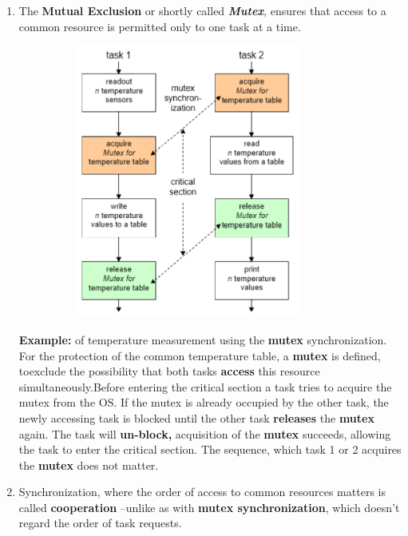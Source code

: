 \begin{enumerate}
\item The \textbf{Mutual Exclusion }or shortly called \textbf{\textit{Mutex}}, ensures that access to a common resource is permitted only to one task at a time. 

 	\begin{figure}[h]
    \centering
    \includegraphics[width=9cm, height=9cm]{Images/image103.png}
    \label{fig:Fig 49}
    \end{figure}
\os{\newpage}
\textbf{Example:} of temperature measurement using the \textbf{mutex} synchronization.\\

For the protection of the common temperature table, a \textbf{mutex} is defined, toexclude the possibility that both tasks \textbf{access} this resource simultaneously.Before entering the critical section a task tries to acquire the mutex from the OS. If the mutex is already occupied by the other task, the newly accessing task is blocked\textbf{\textit{ }}until the other task \textbf{releases} the \textbf{mutex} again. The task will \textbf{un-block,} acquisition of the \textbf{mutex} succeeds, allowing the task to enter the critical section. The sequence, which task 1 or 2 acquires the \textbf{mutex} does not matter.

\item Synchronization, where the order of access to common resources matters is called \textbf{cooperation} --unlike as with\textbf{ mutex synchronization}, which doesn't regard the order of task requests.


\end{enumerate}
